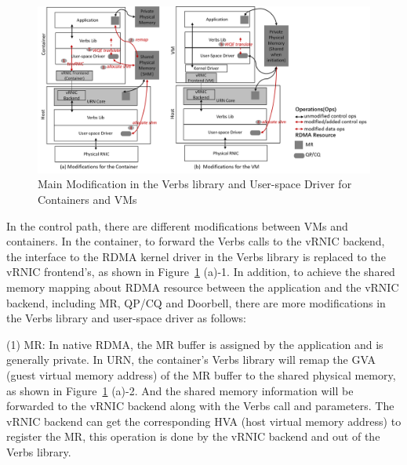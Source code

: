 \begin{figure}[!ht]
	\centering
	\includegraphics[width=1.0\linewidth]{images/verbs-driver}
	\caption{Main Modification in the Verbs library and User-space Driver for Containers and VMs}
	\label{fig:verbs-driver}
\end{figure}

In the control path, there are different modifications between VMs and containers. In the container, to forward the Verbs calls to the vRNIC backend, the interface to the RDMA kernel driver in the Verbs library is replaced to the vRNIC frontend's, as shown in Figure~\ref{fig:verbs-driver} (a)-1. In addition, to achieve the shared memory mapping about RDMA resource between the application and the vRNIC backend, including MR, QP/CQ and Doorbell, there are more modifications in the Verbs library and user-space driver as follows:

(1) MR: In native RDMA, the MR buffer is assigned by the application and is generally private. In URN, the container's Verbs library will remap the GVA (guest virtual memory address) of the MR buffer to the shared physical memory, as shown in Figure~\ref{fig:verbs-driver} (a)-2. And the shared memory information will be forwarded to the vRNIC backend along with the Verbs call and parameters. The vRNIC backend can get the corresponding HVA (host virtual memory address) to register the MR, this operation is done by the vRNIC backend and out of the Verbs library.

